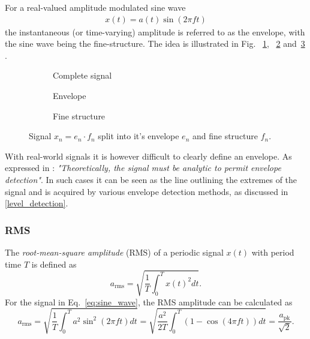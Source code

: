 \documentclass[../main2.tex]{subfiles}
\providecommand{\rootdir}{..}
\begin{document}
For a real-valued amplitude modulated sine wave
\begin{align}
x(t) = a(t)\sin(2 \pi f t)
\end{align}
the instantaneous (or time-varying) amplitude is referred to as the envelope, with the sine wave being the fine-structure. The idea is illustrated in Fig. ~\ref{fig:signal_env_fine_struct}, ~\ref{fig:signal_env} and~\ref{fig:signal_fine_struct} . 
\begin{figure}
\captionsetup{justification=centering}
\begin{subfigure}{\linewidth}
\centering
\centerline{}
\caption{Complete signal}
\label{fig:signal_env_fine_struct}
\end{subfigure}
\par\bigskip
\begin{subfigure}{.5\linewidth}
\centering

\caption{Envelope}
\label{fig:signal_env}
\end{subfigure}
\begin{subfigure}{.5\linewidth}
\centering

\caption{Fine structure}
\label{fig:signal_fine_struct}
\end{subfigure}%
\caption{Signal $x_n = e_n\cdot f_n$ split into it's envelope $e_n$ and fine structure $f_n$.}
\label{fig:analytic_signal}
\end{figure}

With real-world signals it is however difficult to clearly define an envelope. As expressed in \cite{bedrosian1962analytic}: \emph{"Theoretically, the signal must be analytic to permit envelope detection"}. In such cases it can be seen as the line outlining the extremes of the signal and is acquired by various envelope detection methods, as discussed in \ref{level_detection}. 
\subsubsection{RMS}
The \emph{root-mean-square amplitude} (RMS) of a periodic signal $x(t)$ with period time $T$ is defined as
\begin{equation}
a_\text{rms} = \sqrt{ \frac{1}{T} \int_{0}^{T} x(t)^2 dt }.
\end{equation}
For the signal in Eq.~\eqref{eq:sine_wave}, the RMS amplitude can be calculated as
\begin{equation}
a_\text{rms} =
\sqrt{ \frac{1}{T} \int_{0}^{T} a^2 \sin^2 (2 \pi f t) dt } =
\sqrt{ \frac{a^2}{2T} \int_{0}^{T}\left( 1 - \cos (4 \pi f t) \right) dt } =
\frac{a_\text{pk}}{\sqrt 2}.
\end{equation}
\end{document}
